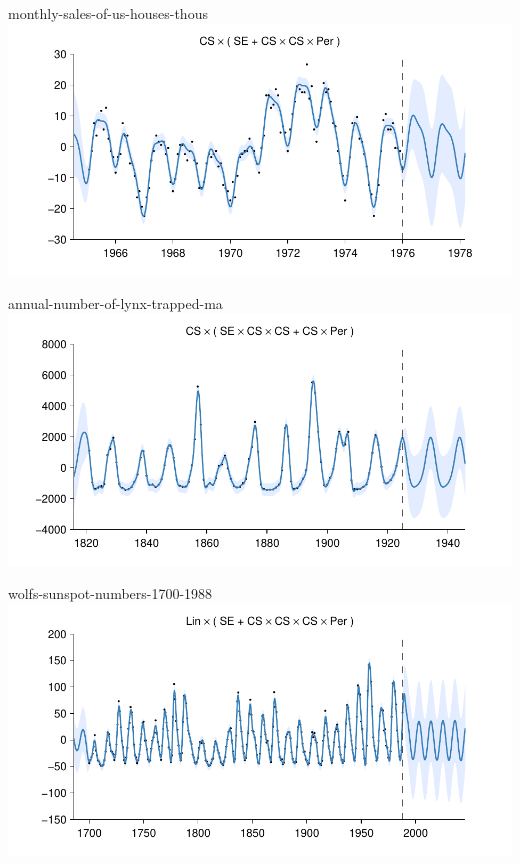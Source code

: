 \begin{frame}{monthly-sales-of-us-houses-thous}
  \center
  \includegraphics[width=1.0\textwidth]{figures/monthly-sales-of-us-houses-thous/monthly-sales-of-us-houses-thous_all}
\end{frame}

\begin{frame}{annual-number-of-lynx-trapped-ma}
  \center
  \includegraphics[width=1.0\textwidth]{figures/annual-number-of-lynx-trapped-ma/annual-number-of-lynx-trapped-ma_all}
\end{frame}

\begin{frame}{wolfs-sunspot-numbers-1700-1988}
  \center
  \includegraphics[width=1.0\textwidth]{figures/wolfs-sunspot-numbers-1700-1988/wolfs-sunspot-numbers-1700-1988_all}
\end{frame}  

